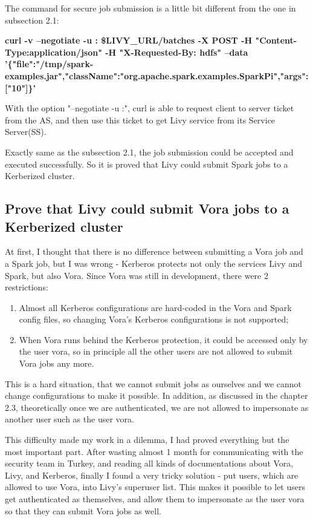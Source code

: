\documentclass[article,colorback,accentcolor=tud4c]{tudreport}
\begin{document}
	The command for secure job submission is a little bit different from the one in subsection 2.1:
	
	\noindent\textbf{curl -v --negotiate -u : \$LIVY\_URL/batches -X POST -H "Content-Type:application/json" -H "X-Requested-By: hdfs" --data '\{"file":"/tmp/spark-examples.jar","className":"org.apache.spark.examples.SparkPi","args":["10"]\}'}
	
	With the option "--negotiate -u :", curl is able to request client to server ticket from the AS, and then use this ticket to get Livy service from its Service Server(SS).
	
	Exactly same as the subsection 2.1, the job submission could be accepted and executed successfully. So it is proved that Livy could submit Spark jobs to a Kerberized cluster.
		
	\subsection{Prove that Livy could submit Vora jobs to a Kerberized cluster}
	
	At first, I thought that there is no difference between submitting a Vora job and a Spark job, but I was wrong - Kerberos protects not only the services Livy and Spark, but also Vora. Since Vora was still in development, there were 2 restrictions:
	
	\begin{enumerate}
		\item Almost all Kerberos configurations are hard-coded in the Vora and Spark config files, so changing Vora's Kerberos configurations is not supported;
		\item When Vora runs behind the Kerberos protection, it could be accessed only by the user vora, so in principle all the other users are not allowed to submit Vora jobs any more.
	\end{enumerate}
	
	This is a hard situation, that we cannot submit jobs as ourselves and we cannot change configurations to make it possible. In addition, as discussed in the chapter 2.3, theoretically once we are authenticated, we are not allowed to impersonate as another user such as the user vora.
	
	This difficulty made my work in a dilemma, I had proved everything but the most important part. After wasting almost 1 month for communicating with the security team in Turkey, and reading all kinds of documentations about Vora, Livy, and Kerberos, finally I found a very tricky solution - put users, which are allowed to use Vora, into Livy's superuser list. This makes it possible to let users get authenticated as themselves, and allow them to impersonate as the user vora so that they can submit Vora jobs as well.
	
\end{document}
